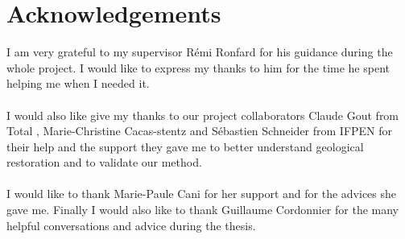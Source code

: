 \documentclass[12pt, a4paper]{report} %
\begin{document}
\chapter*{Acknowledgements}

I am very grateful to my supervisor R\'emi Ronfard for his guidance during the whole project. I would like to express my thanks to him for the time he spent helping me when I needed it.
\\\\
I would also like give my thanks to our project collaborators Claude Gout from Total , Marie-Christine Cacas-stentz and S\'ebastien Schneider from IFPEN for their help and the support they gave me to better understand geological restoration and to validate our method. 
\\\\
I would like to thank Marie-Paule Cani for her support and for the advices she gave me. Finally I would also like to thank Guillaume Cordonnier for the many helpful conversations and advice during the thesis.
\newpage
\tableofcontents
\end{document}
